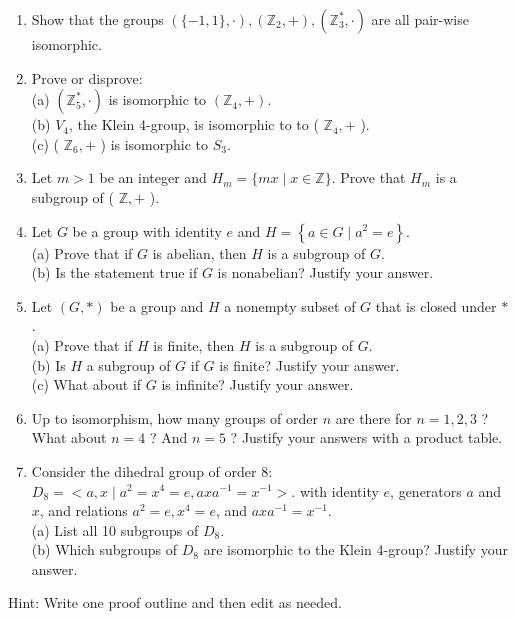 \begin{enumerate}
  \item Show that the groups $(\{-1,1\}, \cdot),\left(\mathbb{Z}_{2},+\right),\left(\mathbb{Z}_{3}^{*}, \cdot\right)$ are all pair-wise isomorphic.
  \item Prove or disprove:\\
(a) $\left(\mathbb{Z}_{5}^{*}, \cdot\right)$ is isomorphic to $\left(\mathbb{Z}_{4},+\right)$.\\
(b) $V_{4}$, the Klein 4-group, is isomorphic to to ( $\mathbb{Z}_{4},+$ ).\\
(c) ( $\mathbb{Z}_{6},+$ ) is isomorphic to $S_{3}$.
  \item Let $m>1$ be an integer and $H_{m}=\{m x \mid x \in \mathbb{Z}\}$. Prove that $H_{m}$ is a subgroup of ( $\mathbb{Z},+$ ).
  \item Let $G$ be a group with identity $e$ and $H=\left\{a \in G \mid a^{2}=e\right\}$.\\
(a) Prove that if $G$ is abelian, then $H$ is a subgroup of $G$.\\
(b) Is the statement true if $G$ is nonabelian? Justify your answer.
  \item Let $(G, *)$ be a group and $H$ a nonempty subset of $G$ that is closed under $*$.\\
(a) Prove that if $H$ is finite, then $H$ is a subgroup of $G$.\\
(b) Is $H$ a subgroup of $G$ if $G$ is finite? Justify your answer.\\
(c) What about if $G$ is infinite? Justify your answer.
  \item Up to isomorphism, how many groups of order $n$ are there for $n=1,2,3$ ? What about $n=4$ ? And $n=5$ ? Justify your answers with a product table.
  \item Consider the dihedral group of order 8: $D_{8}=<a, x \mid a^{2}=x^{4}=e, a x a^{-1}=x^{-1}>$. with identity $e$, generators $a$ and $x$, and relations $a^{2}=e, x^{4}=e$, and $a x a^{-1}=x^{-1}$.\\
(a) List all 10 subgroups of $D_{8}$.\\
(b) Which subgroups of $D_{8}$ are isomorphic to the Klein 4-group? Justify your answer.
\end{enumerate}



\newpage
Hint: Write one proof outline and then edit as needed.

